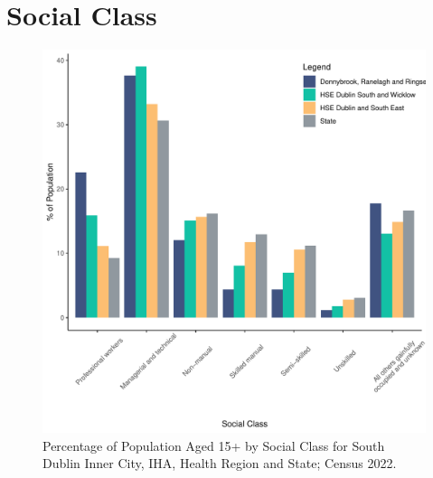 \documentclass{article}
\begin{document}
\section{Social Class}\label{sect:SC}
\begin{figure}[H]
	\centering
	\includegraphics[width = 140mm]{../figures/SocialClassED.pdf}
	\caption{Percentage of Population Aged 15+ by Social Class for South Dublin Inner City, IHA, Health Region and State; Census 2022.}
	\label{fig:vbnv}
	\end{figure}
\end{document}
